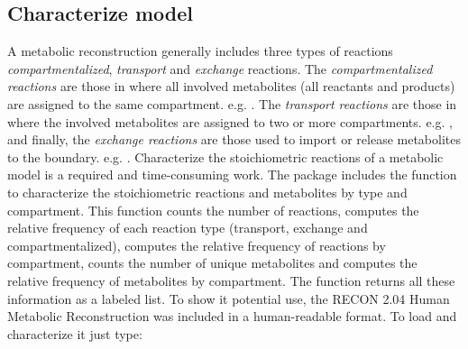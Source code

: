 \subsection{Characterize model}
A metabolic reconstruction generally includes three types of reactions \textit{compartmentalized}, \textit{transport} and \textit{exchange} reactions. The \textit{compartmentalized reactions} are those in where all involved metabolites (all reactants and products) are assigned to the same compartment. e.g. . The \textit{transport reactions} are those in where the involved metabolites are assigned to two or more compartments. e.g. , and finally, the \textit{exchange reactions} are those used to import or release metabolites to the boundary. e.g. . Characterize the stoichiometric reactions of a metabolic model is a required and time-consuming work. The  package includes the  function to characterize the stoichiometric reactions and metabolites by type and compartment. This function counts the number of reactions, computes the relative frequency of each reaction type (transport, exchange and compartmentalized), computes the relative frequency of reactions by compartment, counts the number of unique metabolites and computes the relative frequency of metabolites by compartment. The  function returns all these information as a labeled list. To show it potential use, the RECON 2.04 Human Metabolic Reconstruction \citep{RECON2} was included in a human-readable format. To load and characterize it just type:
\begin{Schunk}
\end{Schunk}
